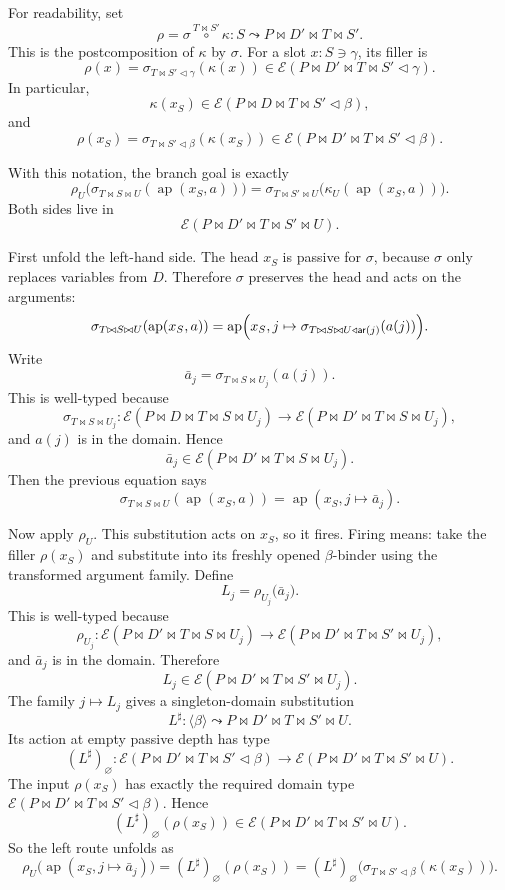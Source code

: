 \documentclass[11pt]{article}
\newcommand{\E}{\mathcal E}
\newcommand{\arity}{\mathsf{ar}}
\newcommand{\ext}{\mathbin{\triangleleft}}
\newcommand{\pcomp}[3]{#1 \overset{#2}{\circ} #3}
\begin{document}
For readability, set
\[
  \rho = \pcomp{\sigma}{T \bowtie S'}{\kappa}
  :
  S \leadsto P \bowtie D' \bowtie T \bowtie S'.
\]
This is the postcomposition of \(\kappa\) by \(\sigma\).  For a slot
\(x : S \ni \gamma\), its filler is
\[
  \rho(x)
  =
  \sigma_{T \bowtie S' \ext \gamma}(\kappa(x))
  \in
  \E(P \bowtie D' \bowtie T \bowtie S' \ext \gamma).
\]
In particular,
\[
  \kappa(x_S)
  \in
  \E(P \bowtie D \bowtie T \bowtie S' \ext \beta),
\]
and
\[
  \rho(x_S)
  =
  \sigma_{T \bowtie S' \ext \beta}(\kappa(x_S))
  \in
  \E(P \bowtie D' \bowtie T \bowtie S' \ext \beta).
\]

With this notation, the branch goal is exactly
\[
  \rho_U
  \bigl(
    \sigma_{T \bowtie S \bowtie U}
      (\operatorname{ap}(x_S,a))
  \bigr)
  =
  \sigma_{T \bowtie S' \bowtie U}
  \bigl(
    \kappa_U(\operatorname{ap}(x_S,a))
  \bigr).
\]
Both sides live in
\[
  \E(P \bowtie D' \bowtie T \bowtie S' \bowtie U).
\]

First unfold the left-hand side.  The head \(x_S\) is passive for \(\sigma\),
because \(\sigma\) only replaces variables from \(D\).  Therefore \(\sigma\)
preserves the head and acts on the arguments:
\[
  \sigma_{T \bowtie S \bowtie U}(\operatorname{ap}(x_S,a))
  =
  \operatorname{ap}
  \Bigl(
    x_S,
    j \mapsto
      \sigma_{T \bowtie S \bowtie U \ext \arity(j)}(a(j))
  \Bigr).
\]
Write
\[
  \bar a_j =
  \sigma_{T \bowtie S \bowtie U_j}(a(j)).
\]
This is well-typed because
\[
  \sigma_{T \bowtie S \bowtie U_j} :
  \E(P \bowtie D \bowtie T \bowtie S \bowtie U_j)
  \to
  \E(P \bowtie D' \bowtie T \bowtie S \bowtie U_j),
\]
and \(a(j)\) is in the domain.  Hence
\[
  \bar a_j
  \in
  \E(P \bowtie D' \bowtie T \bowtie S \bowtie U_j).
\]
Then the previous equation says
\[
  \sigma_{T \bowtie S \bowtie U}(\operatorname{ap}(x_S,a))
  =
  \operatorname{ap}(x_S, j \mapsto \bar a_j).
\]

Now apply \(\rho_U\).  This substitution acts on \(x_S\), so it fires.  Firing
means: take the filler \(\rho(x_S)\) and substitute into its freshly opened
\(\beta\)-binder using the transformed argument family.  Define
\[
  L_j =
  \rho_{U_j}
  \bigl(
    \bar a_j
  \bigr).
\]
This is well-typed because
\[
  \rho_{U_j} :
  \E(P \bowtie D' \bowtie T \bowtie S \bowtie U_j)
  \to
  \E(P \bowtie D' \bowtie T \bowtie S' \bowtie U_j),
\]
and \(\bar a_j\) is in the domain.  Therefore
\[
  L_j
  \in
  \E(P \bowtie D' \bowtie T \bowtie S' \bowtie U_j).
\]
The family \(j \mapsto L_j\) gives a singleton-domain substitution
\[
  L^\sharp :
  \langle\beta\rangle
  \leadsto
  P \bowtie D' \bowtie T \bowtie S' \bowtie U.
\]
Its action at empty passive depth has type
\[
  (L^\sharp)_\varnothing :
  \E(P \bowtie D' \bowtie T \bowtie S' \ext \beta)
  \to
  \E(P \bowtie D' \bowtie T \bowtie S' \bowtie U).
\]
The input \(\rho(x_S)\) has exactly the required domain type
\(\E(P \bowtie D' \bowtie T \bowtie S' \ext \beta)\).  Hence
\[
  (L^\sharp)_\varnothing(\rho(x_S))
  \in
  \E(P \bowtie D' \bowtie T \bowtie S' \bowtie U).
\]
So the left route unfolds as
\[
  \rho_U
  \bigl(
    \operatorname{ap}(x_S, j \mapsto \bar a_j)
  \bigr)
  =
  (L^\sharp)_\varnothing(\rho(x_S))
  =
  (L^\sharp)_\varnothing
  \bigl(\sigma_{T \bowtie S' \ext \beta}(\kappa(x_S))\bigr).
\]
\end{document}

